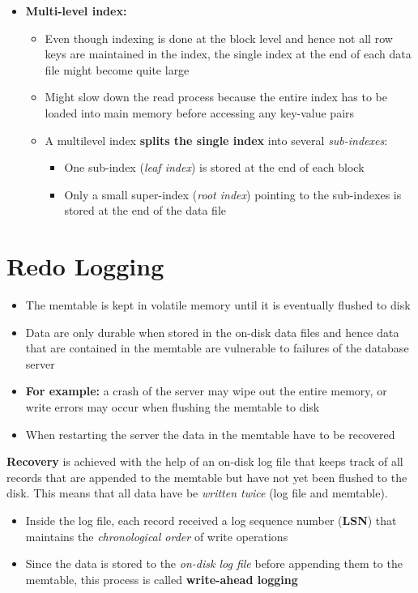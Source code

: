\begin{itemize}
    \item \textbf{Multi-level index:}
    \begin{itemize}
        \item Even though indexing is done at the block level and hence not all row keys are maintained in the index, the single index at the end of each data file might become quite large
        \item Might slow down the read process because the entire index has to be loaded into main memory before accessing any key-value pairs
        \item A multilevel index \textbf{splits the single index} into several \textit{sub-indexes}:
        \begin{itemize}
            \item One sub-index (\textit{leaf index}) is stored at the end of each block
            \item Only a small super-index (\textit{root index})  pointing to the sub-indexes is stored at the end of the data file
        \end{itemize}
    \end{itemize}
\end{itemize}

\section{Redo Logging}
\begin{itemize}
    \item The memtable is kept in volatile memory until it is eventually flushed to disk
    \item Data are only durable when stored in the on-disk data files and hence data that are contained in the memtable are vulnerable to failures of the database server
    \item \textbf{For example:} a crash of the server may wipe out the entire memory, or write errors may occur when flushing the memtable to disk
    \item When restarting the server the data in the memtable have to be recovered
\end{itemize}
\textbf{Recovery} is achieved with the help of an on-disk log file that keeps track of all records that are appended to the memtable but have not yet been flushed to the disk. This means that all data have be \textit{written twice} (log file and memtable).
\begin{itemize}
    \item Inside the log file, each record received a log sequence number (\textbf{LSN}) that maintains the \textit{chronological order} of write operations
    \item Since the data is stored to the \textit{on-disk log file} before appending them to the memtable, this process is called \textbf{write-ahead logging}
\end{itemize}

